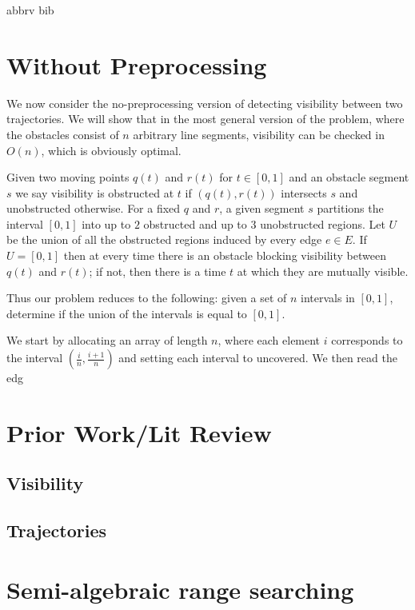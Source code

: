 \documentclass[a4paper, UKenglish]{lipics-v2018}
\begin{document}
\newpage
 {abbrv}
 {bib}



\newpage
\appendix

\section{Without Preprocessing}
We now consider the no-preprocessing version of detecting visibility between two trajectories. We will show that in the most general version of the problem, where the obstacles consist of $n$ arbitrary line segments, visibility can be checked in $O(n)$, which is obviously optimal.

Given two moving points $q(t)$ and $r(t)$ for $t \in [0, 1]$ and an obstacle segment $s$ we say visibility is obstructed at $t$ if $(q(t), r(t))$ intersects $s$ and unobstructed otherwise. For a fixed $q$ and $r$, a given segment $s$ partitions the interval $[0, 1]$ into up to $2$ obstructed and up to $3$ unobstructed regions. Let $U$ be the union of all the obstructed regions induced by every edge $e \in E$. If $U = [0,1]$ then at every time there is an obstacle blocking visibility between $q(t)$ and $r(t)$; if not, then there is a time $t$ at which they are mutually visible.

Thus our problem reduces to the following: given a set of $n$ intervals in $[0,1]$, determine if the union of the intervals is equal to $[0,1]$.

We start by allocating an array of length $n$, where each element $i$ corresponds to the interval $(\frac{i}{n}, \frac{i+1}{n})$ and setting each interval to uncovered. We then read the edg


\section{Prior Work/Lit Review}
\subsection{Visibility}
\subsection{Trajectories}

\section{Semi-algebraic range searching}
\label{appx:rangesearch}
\end{document}
